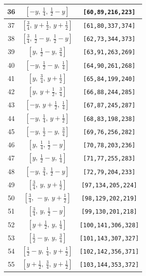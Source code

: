 \documentclass[fleqn,8pt]{jsarticle}
\begin{document}
\begin{longtable}{ccc}
36 & $\left[ - y,\, \frac{1}{4},\, \frac{1}{2} - y \right]$ & {\tt [60,89,216,223]} \\ \hline
37 & $\left[ \frac{3}{4},\, y + \frac{1}{2},\, y + \frac{1}{2} \right]$ & {\tt [61,80,337,374]} \\ \hline
38 & $\left[ \frac{3}{4},\, \frac{1}{2} - y,\, \frac{1}{2} - y \right]$ & {\tt [62,73,344,373]} \\ \hline
39 & $\left[ y,\, \frac{1}{2} - y,\, \frac{3}{4} \right]$ & {\tt [63,91,263,269]} \\ \hline
40 & $\left[ - y,\, \frac{1}{2} - y,\, \frac{1}{4} \right]$ & {\tt [64,90,261,268]} \\ \hline
41 & $\left[ y,\, \frac{3}{4},\, y + \frac{1}{2} \right]$ & {\tt [65,84,199,240]} \\ \hline
42 & $\left[ y,\, y + \frac{1}{2},\, \frac{3}{4} \right]$ & {\tt [66,88,244,285]} \\ \hline
43 & $\left[ - y,\, y + \frac{1}{2},\, \frac{1}{4} \right]$ & {\tt [67,87,245,287]} \\ \hline
44 & $\left[ - y,\, \frac{1}{4},\, y + \frac{1}{2} \right]$ & {\tt [68,83,198,238]} \\ \hline
45 & $\left[ - y,\, \frac{1}{2} - y,\, \frac{3}{4} \right]$ & {\tt [69,76,256,282]} \\ \hline
46 & $\left[ y,\, \frac{1}{4},\, \frac{1}{2} - y \right]$ & {\tt [70,78,203,236]} \\ \hline
47 & $\left[ y,\, \frac{1}{2} - y,\, \frac{1}{4} \right]$ & {\tt [71,77,255,283]} \\ \hline
48 & $\left[ - y,\, \frac{3}{4},\, \frac{1}{2} - y \right]$ & {\tt [72,79,204,233]} \\ \hline
49 & $\left[ \frac{3}{4},\, y,\, y + \frac{1}{2} \right]$ & {\tt [97,134,205,224]} \\ \hline
50 & $\left[ \frac{3}{4},\, - y,\, y + \frac{1}{2} \right]$ & {\tt [98,129,202,219]} \\ \hline
51 & $\left[ \frac{3}{4},\, y,\, \frac{1}{2} - y \right]$ & {\tt [99,130,201,218]} \\ \hline
52 & $\left[ y + \frac{1}{2},\, y,\, \frac{1}{4} \right]$ & {\tt [100,141,306,328]} \\ \hline
53 & $\left[ \frac{1}{2} - y,\, y,\, \frac{3}{4} \right]$ & {\tt [101,143,307,327]} \\ \hline
54 & $\left[ \frac{1}{2} - y,\, \frac{1}{4},\, y + \frac{1}{2} \right]$ & {\tt [102,142,356,371]} \\ \hline
55 & $\left[ y + \frac{1}{2},\, \frac{3}{4},\, y + \frac{1}{2} \right]$ & {\tt [103,144,353,372]} \\ \hline

\end{longtable}
\end{document}
